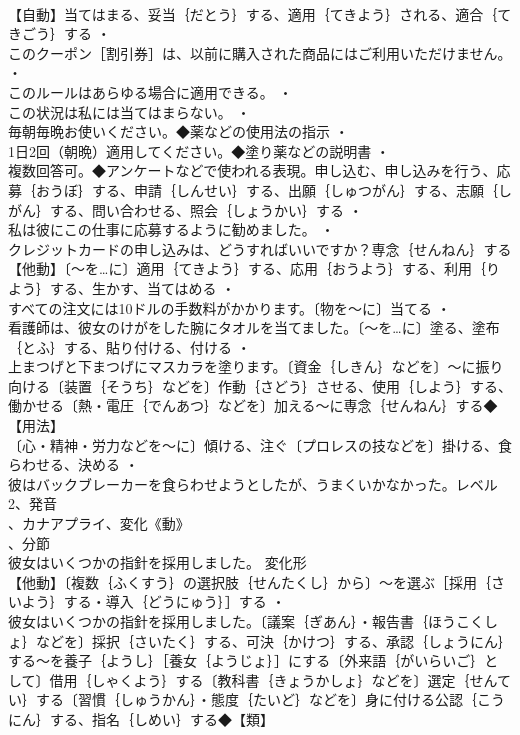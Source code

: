 \documentclass[8pt]{extreport}
\begin{document}
\begin{CJK}{UTF8}{min}
\\	【自動】当てはまる、妥当｛だとう｝する、適用｛てきよう｝される、適合｛てきごう｝する ・
\\	このクーポン［割引券］は、以前に購入された商品にはご利用いただけません。 ・
\\	このルールはあらゆる場合に適用できる。 ・
\\	この状況は私には当てはまらない。 ・
\\	毎朝毎晩お使いください。◆薬などの使用法の指示 ・
\\	1日2回（朝晩）適用してください。◆塗り薬などの説明書 ・
\\	複数回答可。◆アンケートなどで使われる表現。申し込む、申し込みを行う、応募｛おうぼ｝する、申請｛しんせい｝する、出願｛しゅつがん｝する、志願｛しがん｝する、問い合わせる、照会｛しょうかい｝する ・
\\	私は彼にこの仕事に応募するように勧めました。 ・
\\	クレジットカードの申し込みは、どうすればいいですか？専念｛せんねん｝する【他動】〔～を…に〕適用｛てきよう｝する、応用｛おうよう｝する、利用｛りよう｝する、生かす、当てはめる ・
\\	すべての注文には10ドルの手数料がかかります。〔物を～に〕当てる ・
\\	看護師は、彼女のけがをした腕にタオルを当てました。〔～を…に〕塗る、塗布｛とふ｝する、貼り付ける、付ける ・
\\	上まつげと下まつげにマスカラを塗ります。〔資金｛しきん｝などを〕～に振り向ける〔装置｛そうち｝などを〕作動｛さどう｝させる、使用｛しよう｝する、働かせる〔熱・電圧｛でんあつ｝などを〕加える～に専念｛せんねん｝する◆【用法】
\\	〔心・精神・労力などを～に〕傾ける、注ぐ〔プロレスの技などを〕掛ける、食らわせる、決める ・
\\	彼はバックブレーカーを食らわせようとしたが、うまくいかなかった。レベル2、発音
\\	、カナアプライ、変化《動》
\\	、分節
\\	彼女はいくつかの指針を採用しました。	変化形 
\\	【他動】〔複数｛ふくすう｝の選択肢｛せんたくし｝から〕～を選ぶ［採用｛さいよう｝する・導入｛どうにゅう｝］する ・
\\	彼女はいくつかの指針を採用しました。〔議案｛ぎあん｝・報告書｛ほうこくしょ｝などを〕採択｛さいたく｝する、可決｛かけつ｝する、承認｛しょうにん｝する～を養子｛ようし｝［養女｛ようじょ｝］にする〔外来語｛がいらいご｝として〕借用｛しゃくよう｝する〔教科書｛きょうかしょ｝などを〕選定｛せんてい｝する〔習慣｛しゅうかん｝・態度｛たいど｝などを〕身に付ける公認｛こうにん｝する、指名｛しめい｝する◆【類】

\end{CJK}
\end{document}
